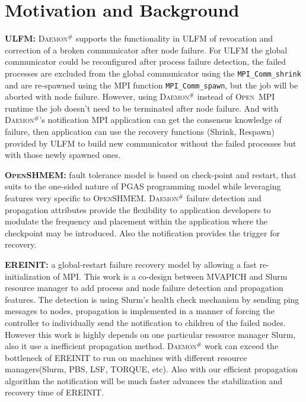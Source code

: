 \documentclass[sigconf]{acmart}
\newcommand{\mpifunc}[1]{\lstinline"MPI_#1"\xspace}
\newcommand{\ompi}[0]{\textsc{Open~MPI}\xspace}
\newcommand{\ulfm}[0]{\textsc{ULFM}\xspace}
\newcommand{\mpi}[0]{\textsc{MPI}\xspace}
\newcommand{\oshmem}[0]{\textsc{OpenSHMEM}\xspace}
\newcommand{\ourwork}[0]{\textsc{Daemon}\ensuremath{^\#}\xspace}
\begin{document}
\section{Motivation and Background}\label{sec:motivation}

\textbf{\ulfm:} \ourwork supports the functionality in \ulfm of revocation and correction of a broken communicator after node failure. For \ulfm the global communicator could be reconfigured after process failure detection, the failed processes are excluded from the global communicator using the \mpifunc{Comm_shrink} and are re-spawned using the \mpi function \mpifunc{Comm_spawn}, but the job will be aborted with node failure. However, using \ourwork instead of \ompi runtime the job doesn't need to be terminated after node failure. And with \ourwork's notification \mpi application can get the consensus knowledge of failure, then application can use the recovery functions (Shrink, Respawn) provided by \ulfm to build new communicator without the failed processes but with those newly spawned ones. 

\textbf{\oshmem:} fault tolerance model is based on check-point and restart, that suits to the one-sided nature of PGAS programming model while leveraging features very specific to \oshmem. \ourwork failure detection and propagation attributes provide the flexibility to application developers to modulate the frequency and placement within the application where the checkpoint may be introduced. Also the notification provides the trigger for recovery. 

\textbf{EREINIT:} a global-restart failure recovery model by allowing a fast re-initialization of \mpi. This work is a co-design between MVAPICH and Slurm resource manager to add process and node failure detection and propagation features. The detection is using Slurm's health check mechanism by sending ping messages to nodes, propagation is implemented in a manner of forcing the controller to individually send the notification to children of the failed nodes. However this work is highly depends on one particular resource manager Slurm, also it use a inefficient propagation method. \ourwork work can exceed the bottleneck of EREINIT to run on machines with different resource managers(Slurm, PBS, LSF, TORQUE, etc). Also with our efficient propagation algorithm the notification will be much faster advances the stabilization and recovery time of EREINIT.
\end{document}
